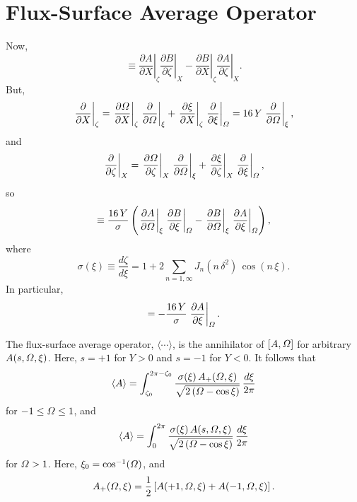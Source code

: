 \documentclass[12pt,prb,aps,notitlepage]{revtex4-1}
\begin{document}
\section{Flux-Surface Average Operator}
Now,
\begin{equation}
[A,B] \equiv \left.\frac{\partial A}{\partial X}\right|_\zeta\left.\frac{\partial B}{\partial\zeta}\right|_X- \left.\frac{\partial B}{\partial X}\right|_\zeta\left.\frac{\partial A}{\partial\zeta}\right|_X.
\end{equation}
But,
\begin{equation}
\left.\frac{\partial}{\partial X}\right|_\zeta= \left.\frac{\partial{\mit\Omega}}{\partial X}\right|_\zeta\left.\frac{\partial}{\partial{\mit\Omega}}\right|_{\xi}+ \left.\frac{\partial\xi}{\partial X}\right|_\zeta\left.\frac{\partial}{\partial\xi}\right|_{\mit\Omega}=16\,Y\left.\frac{\partial}{\partial{\mit\Omega}}\right|_{\xi},
\end{equation}
and
\begin{equation}
\left.\frac{\partial}{\partial \zeta}\right|_X= \left.\frac{\partial{\mit\Omega}}{\partial \zeta}\right|_X\left.\frac{\partial}{\partial{\mit\Omega}}\right|_{\xi}+ \left.\frac{\partial\xi}{\partial \zeta}\right|_X\left.\frac{\partial}{\partial\xi}\right|_{\mit\Omega},
\end{equation}
so
\begin{equation}
[A,B] \equiv \frac{16\,Y}{\sigma}\left(\left.\frac{\partial A}{\partial{\mit\Omega}}\right|_\xi\left.\frac{\partial B}{\partial\xi}\right|_{\mit\Omega}-\left.\frac{\partial B}{\partial{\mit\Omega}}\right|_\xi\left.\frac{\partial A}{\partial\xi}\right|_{\mit\Omega}\right),
\end{equation}
where
\begin{equation}
\sigma(\xi) \equiv\frac{d\zeta}{d\xi}=  1+2\sum_{n=1,\infty} J_n(n\,\delta^2)\,\cos(n\,\xi).
\end{equation}
In particular,
\begin{equation}
[A,{\mit\Omega}] = -\frac{16\,Y}{\sigma}\left.\frac{\partial A}{\partial\xi}\right|_{\mit\Omega}.
\end{equation}

The flux-surface average operator, $\langle\cdots\rangle$, is the annihilator of $[A,{\mit\Omega}]$ for arbitrary $A(s,{\mit\Omega},\xi)$. Here, $s=+1$ for $Y>0$ and $s=-1$ for
$Y<0$. It follows that
\begin{equation}
\langle A\rangle = \int_{\zeta_0}^{2\pi-\zeta_0}\frac{\sigma(\xi)\,A_+({\mit\Omega},\xi)}{\sqrt{2\,({\mit\Omega}-\cos\xi)}}\,\frac{d\xi}{2\pi}
\end{equation}
for $-1\leq {\mit\Omega}\leq 1$, and
\begin{equation}
\langle A\rangle = \int_0^{2\pi}\frac{\sigma(\xi)\,A(s,{\mit\Omega},\xi)}{\sqrt{2\,({\mit\Omega}-\cos\xi)}}\,\frac{d\xi}{2\pi}
\end{equation}
for ${\mit\Omega}>1$. Here, $\xi_0=\cos^{-1}({\mit\Omega})$, and
\begin{equation}
A_+({\mit\Omega},\xi)= \frac{1}{2}\left[A(+1,{\mit\Omega},\xi) + A(-1,{\mit\Omega},\xi)\right].
\end{equation}
\end{document}
